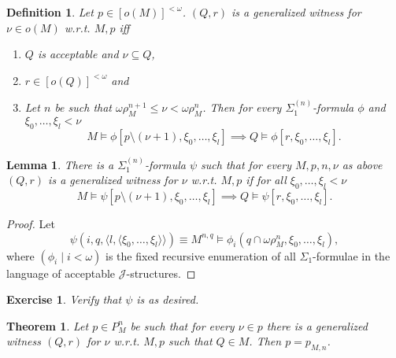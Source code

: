 \documentclass[12pt,a4paper]{article}
\theoremstyle{nicestyle}
\newtheorem{theorem}{Theorem}[subsection]
\newtheorem{exercise}{Exercise}[subsection]
\newtheorem{definition}{Definition}[subsection]
\newtheorem{lemma}{Lemma}[subsection]
\begin{document}
    \begin{definition}
      Let $p \in [o(M)]^{<\omega}$. $(Q,r)$ is a \emph{generalized
        witness} for $\nu \in o(M)$ w.r.t. $M,p$ iff
      \begin{enumerate}
      \item $Q$ is acceptable and $\nu \subseteq Q$,
      \item $r \in [o(Q)]^{<\omega}$ and
      \item Let $n$ be such that
        $\omega\rho^{n+1}_{M} \le \nu < \omega\rho^{n}_{M}$. Then for
        every $\Sigma^{(n)}_{1}$-formula $\phi$ and
        $\xi_{0}, \ldots, \xi_{l} < \nu$
        \[
          M \models \phi[p \setminus (\nu+1), \xi_{0}, \ldots,
          \xi_{l}] \implies Q \models \phi[r, \xi_{0}, \ldots,
          \xi_{l}].
        \]
      \end{enumerate}
    \end{definition}

    \begin{lemma}
      There is a $\Sigma^{(n)}_{1}$-formula $\psi$ such that for every
      $M,p,n,\nu$ as above $(Q,r)$ is a generalized witness for $\nu$
      w.r.t. $M,p$ if for all $\xi_{0}, \ldots, \xi_{l} < \nu$
      \[
        M \models \psi[p \setminus (\nu+1), \xi_{0}, \ldots, \xi_{l}]
        \implies Q \models \psi[r, \xi_{0}, \ldots, \xi_{l}].
      \]
      \end{lemma}

      \begin{proof}
        Let
        \[
          \psi(i, q, \langle l, \langle \xi_{0}, \ldots, \xi_{l}
          \rangle \rangle) \equiv M^{n,q} \models \phi_{i}(q \cap \omega\rho^{n}_{M},
          \xi_{0}, \ldots, \xi_{l}),
        \]
        where $(\phi_{i} \mid i < \omega)$ is the fixed recursive
        enumeration of all $\Sigma_{1}$-formulae in the language of
        acceptable $\mathcal{J}$-structures.
      \end{proof}

      \begin{exercise}
        Verify that $\psi$ is as desired.
      \end{exercise}

      \begin{theorem}
        Let $p \in P^{n}_{M}$ be such that for every $\nu \in p$ there
        is a generalized witness $(Q,r)$ for $\nu$ w.r.t. $M,p$ such
        that $Q \in M$. Then $p = p_{M,n}$.
      \end{theorem}
\end{document}
